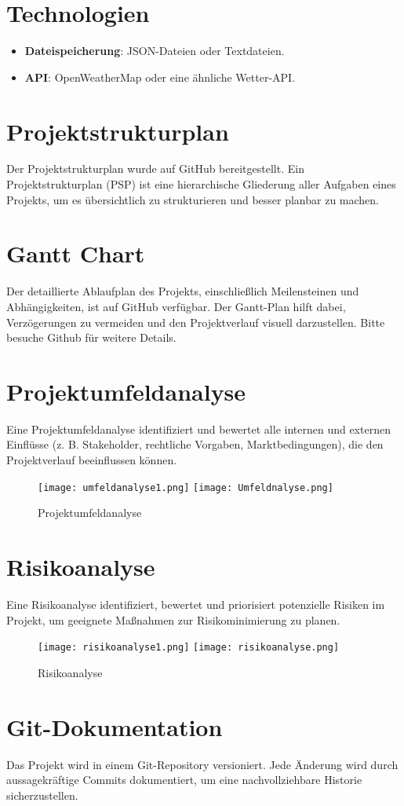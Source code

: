 \documentclass[a4paper,12pt]{article}
\begin{document}
\section{Technologien}
\begin{itemize}
    \item \textbf{Dateispeicherung}: JSON-Dateien oder Textdateien.
    \item \textbf{API}: OpenWeatherMap oder eine ähnliche Wetter-API.
\end{itemize}

\section{Projektstrukturplan}
Der Projektstrukturplan wurde auf GitHub bereitgestellt.
Ein Projektstrukturplan (PSP) ist eine hierarchische Gliederung aller Aufgaben eines Projekts, um es übersichtlich zu strukturieren und besser planbar zu machen.


\section{Gantt Chart}
Der detaillierte Ablaufplan des Projekts, einschließlich Meilensteinen und Abhängigkeiten, ist auf GitHub verfügbar. Der Gantt-Plan hilft dabei, Verzögerungen zu vermeiden und den Projektverlauf visuell darzustellen. Bitte besuche Github für weitere Details.

\section{Projektumfeldanalyse}
Eine Projektumfeldanalyse identifiziert und bewertet alle internen und externen Einflüsse (z. B. Stakeholder, rechtliche Vorgaben, Marktbedingungen), die den Projektverlauf beeinflussen können.

\begin{figure}[h]
    \centering
    \texttt{[image: umfeldanalyse1.png]}
    \texttt{[image: Umfeldnalyse.png]}
    \caption{Projektumfeldanalyse}
    \label{fig:projektumfeldanalyse}
\end{figure}

\section{Risikoanalyse}
Eine Risikoanalyse identifiziert, bewertet und priorisiert potenzielle Risiken im Projekt, um geeignete Maßnahmen zur Risikominimierung zu planen.
\begin{figure}[h]
    \centering
    \texttt{[image: risikoanalyse1.png]}
    \texttt{[image: risikoanalyse.png]}
    \caption{Risikoanalyse}
    \label{fig:risikoanalyse}
\end{figure}

\section{Git-Dokumentation}
Das Projekt wird in einem Git-Repository versioniert. Jede Änderung wird durch aussagekräftige Commits dokumentiert, um eine nachvollziehbare Historie sicherzustellen.
\end{document}
